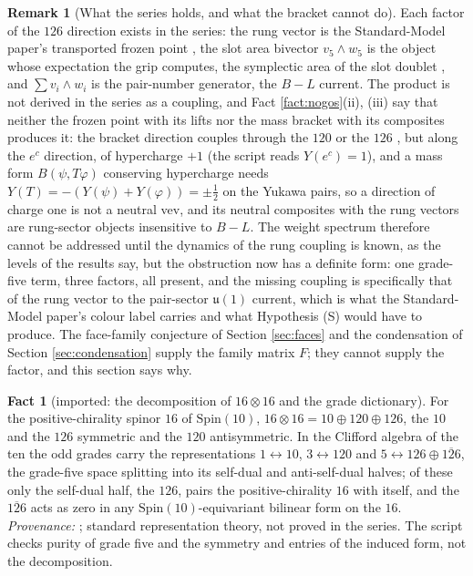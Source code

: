 \documentclass[11pt]{article}
\theoremstyle{definition}
\newtheorem{remark}[theorem]{Remark}
\newtheorem{fact}[theorem]{Fact}
\newcommand{\uu}{\mathfrak{u}}
\begin{document}
\begin{remark}[What the series holds, and what the bracket cannot do]\label{rem:bracket}
Each factor of the $126$ direction exists in the series: the rung vector is the Standard-Model paper's transported frozen point \cite[Prop.~9.27]{ButlerT12}, the slot area bivector $v_{5}\wedge w_{5}$ is the object whose expectation the grip computes, the symplectic area of the slot doublet \cite[Thm.~9.11]{ButlerT12}, and $\sum v_{i}\wedge w_{i}$ is the pair-number generator, the $B - L$ current. The product is not derived in the series as a coupling, and Fact \ref{fact:nogos}(ii), (iii) say that neither the frozen point with its lifts nor the mass bracket with its composites produces it: the bracket direction couples through the $120$ or the $126$ \cite[Prop.~9.15(b)]{ButlerT12}, but along the $e^{c}$ direction, of hypercharge $+1$ (the script reads $Y(e^{c}) = 1$), and a mass form $B(\psi, T\varphi)$ conserving hypercharge needs $Y(T) = -(Y(\psi) + Y(\varphi)) = \pm\tfrac12$ on the Yukawa pairs, so a direction of charge one is not a neutral vev, and its neutral composites with the rung vectors are rung-sector objects insensitive to $B - L$. The weight spectrum therefore cannot be addressed until the dynamics of the rung coupling is known, as the levels of the results say, but the obstruction now has a definite form: one grade-five term, three factors, all present, and the missing coupling is specifically that of the rung vector to the pair-sector $\uu(1)$ current, which is what the Standard-Model paper's colour label carries and what Hypothesis (S) would have to produce. The face-family conjecture of Section \ref{sec:faces} and the condensation of Section \ref{sec:condensation} supply the family matrix $F$; they cannot supply the factor, and this section says why.
\end{remark}

\begin{fact}[imported: the decomposition of $16 \otimes 16$ and the grade dictionary]\label{fact:decomp}
For the positive-chirality spinor $16$ of $\mathrm{Spin}(10)$, $16 \otimes 16 = 10 \oplus 120 \oplus 126$, the $10$ and the $126$ symmetric and the $120$ antisymmetric. In the Clifford algebra of the ten the odd grades carry the representations $1 \leftrightarrow 10$, $3 \leftrightarrow 120$ and $5 \leftrightarrow 126 \oplus \overline{126}$, the grade-five space splitting into its self-dual and anti-self-dual halves; of these only the self-dual half, the $126$, pairs the positive-chirality $16$ with itself, and the $\overline{126}$ acts as zero in any $\mathrm{Spin}(10)$-equivariant bilinear form on the $16$. \emph{Provenance:} \cite{Slansky1981}; standard representation theory, not proved in the series. The script checks purity of grade five and the symmetry and entries of the induced form, not the decomposition.
\end{fact}
\end{document}
